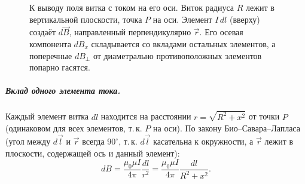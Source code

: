 \documentclass[12pt]{article}
\begin{document}
\begin{figure}[H]
\caption{К выводу поля витка с током на его оси. Виток радиуса $R$ лежит
в вертикальной плоскости, точка $P$ на оси. Элемент $I\,dl$ (вверху)
создаёт $d\vec{B}$, направленный перпендикулярно $\vec{r}$. Его осевая
компонента $dB_x$ складывается со вкладами остальных элементов, а
поперечные $dB_\perp$ от диаметрально противоположных элементов попарно
гасятся.}
\label{fig:loop-field}
\end{figure}

\subparagraph{Вклад одного элемента тока.}
Каждый элемент витка $dl$ находится на расстоянии
$r = \sqrt{R^2 + x^2}$
от точки $P$ (одинаковом для всех элементов, т.\,к. $P$ на оси). По закону
Био--Савара--Лапласа (угол между $d\vec{l}$ и $\vec{r}$ всегда $90^\circ$,
т.\,к. $d\vec{l}$ касательна к окружности, а $\vec{r}$ лежит в плоскости,
содержащей ось и данный элемент):
\[
    dB = \frac{\mu_0\mu I}{4\pi}\frac{dl}{r^2}
    = \frac{\mu_0\mu I}{4\pi}\frac{dl}{R^2 + x^2}.
\]
\end{document}
